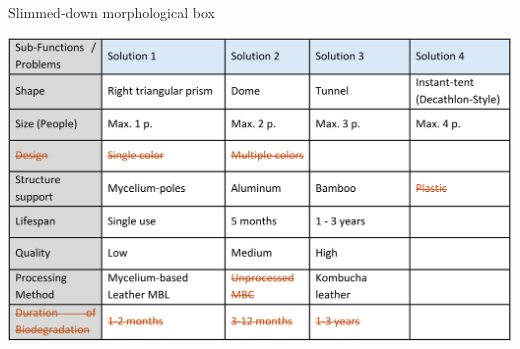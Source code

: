 \documentclass{article}
\begin{document}
\vfill
\begin{table}[ht!]
    \centering
    \caption{Slimmed-down morphological box}
    \label{tab:slimmed_morph}
    \includegraphics[width=\textwidth]{media/slimmed_morph.png}
\end{table}

\newpage
\begin{figure}[ht!]
    \centering
    
    \label{pdf:tent-size}
\end{figure}
\addtocounter{figure}{+0}

\newpage
\begin{figure}[ht!]
    \centering
    
    \label{pdf:mockup-size}
\end{figure}
\addtocounter{figure}{+0}
\end{document}
